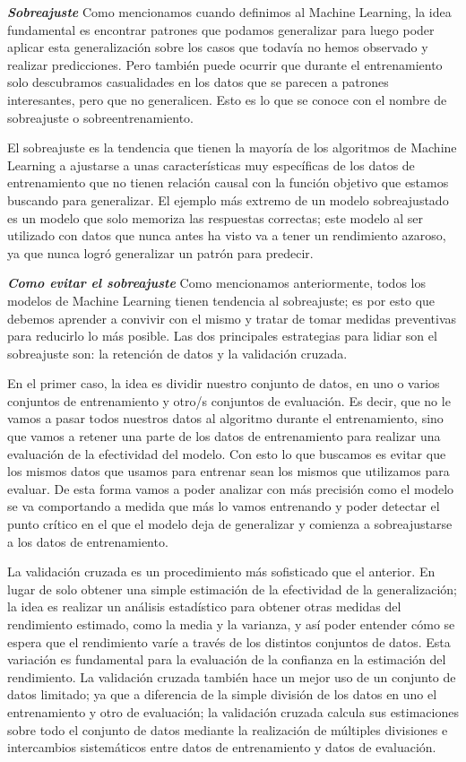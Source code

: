 \textbf{\textit{Sobreajuste}} Como mencionamos cuando definimos al Machine Learning, la idea fundamental es encontrar patrones que podamos generalizar para luego poder aplicar esta generalización sobre los casos que todavía no hemos observado y realizar predicciones. Pero también puede ocurrir que durante el entrenamiento solo descubramos casualidades en los datos que se parecen a patrones interesantes, pero que no generalicen. Esto es lo que se conoce con el nombre de sobreajuste o sobreentrenamiento.

El sobreajuste es la tendencia que tienen la mayoría de los algoritmos de Machine Learning a ajustarse a unas características muy específicas de los datos de entrenamiento que no tienen relación causal con la función objetivo que estamos buscando para generalizar. El ejemplo más extremo de un modelo sobreajustado es un modelo que solo memoriza las respuestas correctas; este modelo al ser utilizado con datos que nunca antes ha visto va a tener un rendimiento azaroso, ya que nunca logró generalizar un patrón para predecir.

\textbf{\textit{Como evitar el sobreajuste}}
Como mencionamos anteriormente, todos los modelos de Machine Learning tienen tendencia al sobreajuste; es por esto que debemos aprender a convivir con el mismo y tratar de tomar medidas preventivas para reducirlo lo más posible. Las dos principales estrategias para lidiar son el sobreajuste son: la retención de datos y la validación cruzada.

En el primer caso, la idea es dividir nuestro conjunto de datos, en uno o varios conjuntos de entrenamiento y otro/s conjuntos de evaluación. Es decir, que no le vamos a pasar todos nuestros datos al algoritmo durante el entrenamiento, sino que vamos a retener una parte de los datos de entrenamiento para realizar una evaluación de la efectividad del modelo. Con esto lo que buscamos es evitar que los mismos datos que usamos para entrenar sean los mismos que utilizamos para evaluar. De esta forma vamos a poder analizar con más precisión como el modelo se va comportando a medida que más lo vamos entrenando y poder detectar el punto crítico en el que el modelo deja de generalizar y comienza a sobreajustarse a los datos de entrenamiento.

La validación cruzada es un procedimiento más sofisticado que el anterior. En lugar de solo obtener una simple estimación de la efectividad de la generalización; la idea es realizar un análisis estadístico para obtener otras medidas del rendimiento estimado, como la media y la varianza, y así poder entender cómo se espera que el rendimiento varíe a través de los distintos conjuntos de datos. Esta variación es fundamental para la evaluación de la confianza en la estimación del rendimiento. La validación cruzada también hace un mejor uso de un conjunto de datos limitado; ya que a diferencia de la simple división de los datos en uno el entrenamiento y otro de evaluación; la validación cruzada calcula sus estimaciones sobre todo el conjunto de datos mediante la realización de múltiples divisiones e intercambios sistemáticos entre datos de entrenamiento y datos de evaluación.

